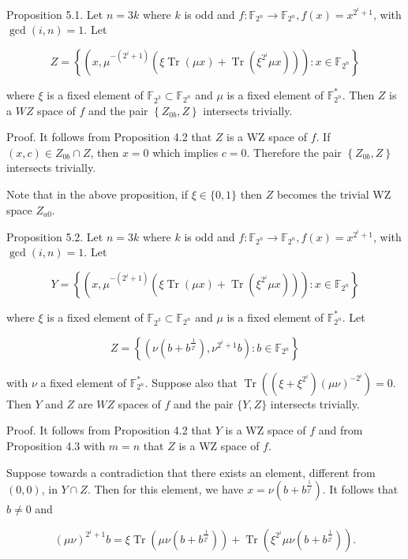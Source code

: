 \documentclass[10pt]{article}
\begin{document}
Proposition 5.1. Let $n=3 k$ where $k$ is odd and $f: \mathbb{F}_{2^{n}} \rightarrow \mathbb{F}_{2^{n}}, f(x)= x^{2^{i}+1}$, with $\operatorname{gcd}(i, n)=1$. Let

$$
Z=\left\{\left(x, \mu^{-\left(2^{i}+1\right)}\left(\xi \operatorname{Tr}(\mu x)+\operatorname{Tr}\left(\xi^{2^{i}} \mu x\right)\right)\right): x \in \mathbb{F}_{2^{n}}\right\}
$$

where $\xi$ is a fixed element of $\mathbb{F}_{2^{3}} \subset \mathbb{F}_{2^{n}}$ and $\mu$ is a fixed element of $\mathbb{F}_{2^{n}}^{*}$. Then $Z$ is a $W Z$ space of $f$ and the pair $\left\{Z_{0 b}, Z\right\}$ intersects trivially.

Proof. It follows from Proposition 4.2 that $Z$ is a WZ space of $f$. If $(x, c) \in Z_{0 b} \cap Z$, then $x=0$ which implies $c=0$. Therefore the pair $\left\{Z_{0 b}, Z\right\}$ intersects trivially.

Note that in the above proposition, if $\xi \in\{0,1\}$ then $Z$ becomes the trivial WZ space $Z_{a 0}$.

Proposition 5.2. Let $n=3 k$ where $k$ is odd and $f: \mathbb{F}_{2^{n}} \rightarrow \mathbb{F}_{2^{n}}, f(x)= x^{2^{i}+1}$, with $\operatorname{gcd}(i, n)=1$. Let

$$
Y=\left\{\left(x, \mu^{-\left(2^{i}+1\right)}\left(\xi \operatorname{Tr}(\mu x)+\operatorname{Tr}\left(\xi^{2^{i}} \mu x\right)\right)\right): x \in \mathbb{F}_{2^{n}}\right\}
$$

where $\xi$ is a fixed element of $\mathbb{F}_{2^{3}} \subset \mathbb{F}_{2^{n}}$ and $\mu$ is a fixed element of $\mathbb{F}_{2^{n}}^{*}$. Let

$$
Z=\left\{\left(\nu\left(b+b^{\frac{1}{2^{i}}}\right), \nu^{2^{i}+1} b\right): b \in \mathbb{F}_{2^{n}}\right\}
$$

with $\nu$ a fixed element of $\mathbb{F}_{2^{n}}^{*}$. Suppose also that $\operatorname{Tr}\left(\left(\xi+\xi^{2^{i}}\right)(\mu \nu)^{-2^{i}}\right)=0$. Then $Y$ and $Z$ are $W Z$ spaces of $f$ and the pair $\{Y, Z\}$ intersects trivially.

Proof. It follows from Proposition 4.2 that $Y$ is a WZ space of $f$ and from Proposition 4.3 with $m=n$ that $Z$ is a WZ space of $f$.

Suppose towards a contradiction that there exists an element, different from $(0,0)$, in $Y \cap Z$. Then for this element, we have $x=\nu\left(b+b^{\frac{1}{2^{i}}}\right)$. It follows that $b \neq 0$ and


\begin{equation*}
(\mu \nu)^{2^{i}+1} b=\xi \operatorname{Tr}\left(\mu \nu\left(b+b^{\frac{1}{2^{i}}}\right)\right)+\operatorname{Tr}\left(\xi^{2^{i}} \mu \nu\left(b+b^{\frac{1}{2^{i}}}\right)\right) . \tag{1}
\end{equation*}
\end{document}

